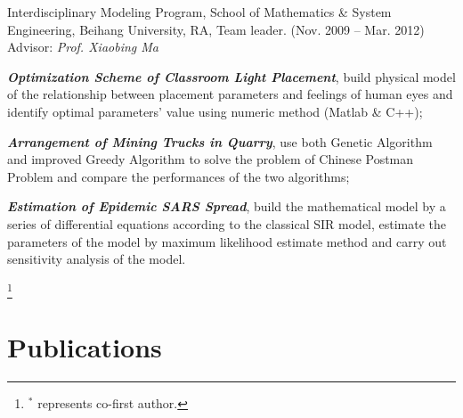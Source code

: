 \documentclass[10pt,letterpaper]{article}
\renewenvironment{itemize}{
\begin{list}{}{
    \setlength{\leftmargin}{1.5em}
    \setlength{\itemsep}{0.25em}
    \setlength{\parskip}{0pt}
    \setlength{\parsep}{0.25em}
    }
    }{
\end{list}
}
\begin{document}
\begin{itemize}
    \item Interdisciplinary Modeling Program, School of Mathematics \& System Engineering, Beihang University, RA, Team leader. (Nov. 2009 -- Mar. 2012) \\
    Advisor: \textit{Prof. Xiaobing Ma}
    \begin{itemize}
        \item \textbf{\textit{Optimization Scheme of Classroom Light Placement}}, build physical model of the relationship between placement parameters and feelings of human eyes and identify optimal parameters' value using numeric method (Matlab \& C++);
        \item \textit{\textbf{Arrangement of Mining Trucks in Quarry}}, use both Genetic Algorithm and improved Greedy Algorithm to solve the problem of Chinese Postman Problem and compare the performances of the two algorithms;
        \item \textbf{\textit{Estimation of Epidemic SARS Spread}}, build the mathematical model by a series of differential equations according to the classical SIR model, estimate the parameters of the model by maximum likelihood estimate method and carry out sensitivity analysis of the model.
    \end{itemize}
\end{itemize}

\newpage
\let\thefootnote\relax\footnote{$^*$ represents co-first author.}

\section*{Publications}
\end{document}
